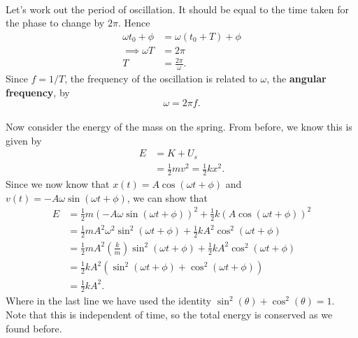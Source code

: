 \documentclass[../classical_mechanics.tex]{subfiles}
\begin{document}
        \paragraph{}
        Let's work out the period of oscillation.
        It should be equal to the time taken for the phase to change by $2\pi$.
        Hence
        \begin{align}
            \omega t_0 + \phi &= \omega(t_0 + T) + \phi\\
            \implies \omega T &= 2\pi\\
            T &= \frac{2\pi}{\omega}.
        \end{align}
        Since $f=1/T$, the frequency of the oscillation is related to $\omega$, the \textbf{angular frequency}, by
        \begin{equation}
            \omega = 2\pi f.
        \end{equation}

        \paragraph{}
        Now consider the energy of the mass on the spring. From before, we know this is given by
        \begin{align}
            E &= K + U_s\\
            &=\frac{1}{2}mv^2=\frac{1}{2}kx^2.
        \end{align}
        Since we now know that $x(t)=A\cos(\omega t+\phi)$ and $v(t)=-A\omega\sin(\omega t+\phi)$, we can show that
        \begin{align}
            E &=\frac{1}{2}m(-A\omega\sin(\omega t+\phi))^2+\frac{1}{2}k(A\cos(\omega t+\phi))^2\\
            &=\frac{1}{2}mA^2\omega^2\sin^2(\omega t+\phi)+\frac{1}{2}kA^2\cos^2(\omega t+\phi)\\
            &=\frac{1}{2}mA^2\left(\frac{k}{m}\right)\sin^2(\omega t+\phi)+\frac{1}{2}kA^2\cos^2(\omega t+\phi)\\
            &=\frac{1}{2}kA^2\left(\sin^2(\omega t+\phi)+\cos^2(\omega t+\phi)\right)\\
            &=\frac{1}{2}kA^2.
        \end{align}
        Where in the last line we have used the identity $\sin^2(\theta)+\cos^2(\theta)=1$.
        Note that this is independent of time, so the total energy is conserved as we found before.
\end{document}
